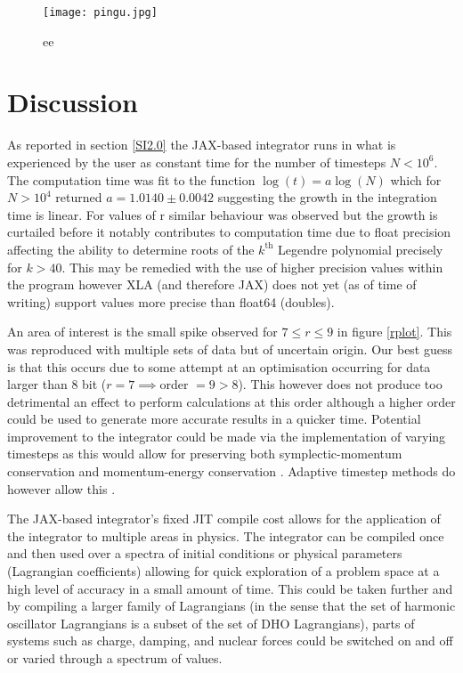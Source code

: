 \documentclass[10pt]{iopart}
\begin{document}
\begin{figure}
	\centering
	\label{lossSlices}
	\texttt{[image: pingu.jpg]}
	\caption{ee}
\end{figure}

\section{Discussion}
As reported in section \ref{SI2.0} the JAX-based integrator runs in what is experienced by the user as constant time for the number of timesteps $N<10^6$. The computation time was fit to the function $\log(t)=a\log(N)$ which for $N>10^4$ returned $a = 1.0140\pm0.0042$ suggesting the growth in the integration time is linear. For values of r similar behaviour was observed but the growth is curtailed before it notably contributes to computation time due to float precision affecting the ability to determine roots of the $k^{\textrm{th}}$ Legendre polynomial precisely for $k>40$. This may be remedied with the use of higher precision values within the program however XLA  (and therefore JAX) does not yet (as of time of writing) support values more precise than float64 (doubles). 

An area of interest is the small spike observed for $7\leq r \leq 9$ in figure \ref{rplot}. This was reproduced with multiple sets of data but of uncertain origin. Our best guess is that this occurs due to some attempt at an optimisation occurring for data larger than 8 bit ($r=7\implies$order $=9 > 8$). This however does not produce too detrimental an effect to perform calculations at this order although a higher order could be used to generate more accurate results in a quicker time. 
Potential improvement to the integrator could be made via the implementation of varying timesteps as this would allow for preserving both symplectic-momentum conservation and momentum-energy conservation \cite{Ge}. Adaptive timestep methods do however allow this \cite{Kane}.




The JAX-based integrator's fixed JIT compile cost allows for the application of the integrator to multiple areas in physics. The integrator can be compiled once and then used over a spectra of initial conditions or physical parameters (Lagrangian coefficients) allowing for quick exploration of a problem space at a high level of accuracy in a small amount of time. This could be taken further and by compiling a larger family of Lagrangians (in the sense that the set of harmonic oscillator Lagrangians is a subset of the set of DHO Lagrangians), parts of systems such as charge, damping, and nuclear forces could be switched on and off or varied through a spectrum of values.
\end{document}
